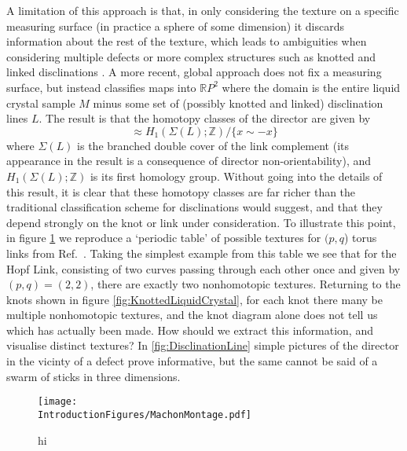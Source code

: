 A limitation of this approach is that, in only considering the texture on a specific measuring surface (in practice a sphere of some dimension) it discards information about the rest of the texture, which leads to ambiguities when considering multiple defects or more complex structures such as knotted and linked disclinations \cite{Alexander,Machon}. A more recent, global approach \cite{Machon} does not fix a measuring surface, but instead classifies maps into $\mathbb{R}P^2$ where the domain is the entire liquid crystal sample $M$ minus some set of (possibly knotted and linked) disclination lines $L$. The result is that the homotopy classes of the director are given by
\begin{equation}
[M-L, \mathbb{R}P^2] \approx H_1(\Sigma(L); \mathbb{Z})/\{ x \sim -x\}
\label{eq:HomotopyClassification}
\end{equation}
where $\Sigma(L)$ is the branched double cover of the link complement (its appearance in the result is a consequence of director non-orientability), and $H_1(\Sigma(L); \mathbb{Z})$ is its first homology group. Without going into the details of this result, it is clear that these homotopy classes are far richer than the traditional classification scheme for disclinations would suggest, and that they depend strongly on the knot or link under consideration. To illustrate this point, in figure \ref{fig:MachonMontage} we reproduce a `periodic table' of possible textures for $(p,q$) torus links from Ref.~\cite{Machon}. Taking the simplest example from this table we see that for the Hopf Link, consisting of two curves passing through each other once and given by $(p,q)=(2,2)$, there are exactly two nonhomotopic textures. Returning to the knots shown in figure \ref{fig:KnottedLiquidCrystal}, for each knot there many be multiple nonhomotopic textures, and the knot diagram alone does not tell us which has actually been made. How should we extract this information, and visualise distinct textures? In \ref{fig:DisclinationLine} simple pictures of the director in the vicinty of a defect prove informative, but the same cannot be said of a swarm of sticks in three dimensions.
\begin{figure}[htbp]
\centering
\texttt{[image: \\IntroductionFigures/MachonMontage.pdf]}
\caption{hi }
\label{fig:MachonMontage}
\end{figure}

